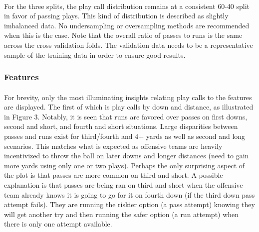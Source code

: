 \documentclass[11pt]{article}
\begin{document}
\begin{multicols*}{2}
                \paragraph{}
                    For the three splits, the play call distribution remains at a consistent 60-40 split in favor of passing plays. 
                    This kind of distribution is described as slightly imbalanced data. 
                    No undersampling or oversampling methods are recommended when this is the case. 
                    Note that the overall ratio of passes to runs is the same across the cross validation folds. 
                    The validation data needs to be a representative sample of the training data in order to ensure good results.
            
            \vspace{-5pt}
            \subsubsection*{Features}
                \paragraph{}
                    For brevity, only the most illuminating insights relating play calls to the features are displayed.
                    The first of which is play calls by down and distance, as illustrated in Figure 3. 
                    Notably, it is seen that runs are favored over passes on first downs, second and short, and fourth and short situations.
                    Large disparities between passes and runs exist for third/fourth and 4+ yards as well as second and long scenarios.
                    This matches what is expected as offensive teams are heavily incentivized to throw the ball on later downs and longer distances (need to gain more yards using only one or two plays). 
                    Perhaps the only surprising aspect of the plot is that passes are more common on third and short.
                    A possible explanation is that passes are being ran on third and short when the offensive team already knows it is going to go for it on fourth down (if the third down pass attempt fails). 
                    They are running the riskier option (a pass attempt) knowing they will get another try and then running the safer option (a run attempt) when there is only one attempt available.  

                \end{multicols*}
\end{document}
